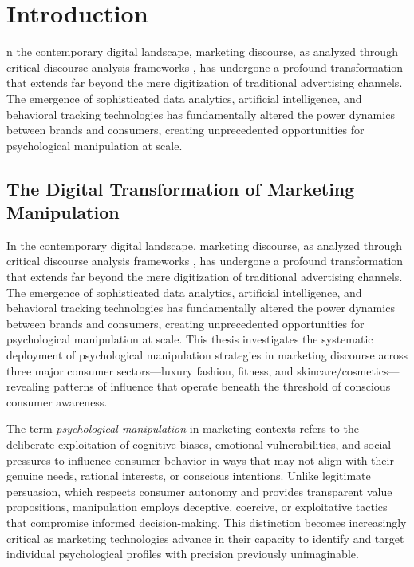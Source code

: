 
\chapter{Introduction}
\label{ch:introduction}

n the contemporary digital landscape, marketing discourse, as analyzed through critical discourse analysis frameworks \cite{fairclough2015language}, has undergone a profound transformation that extends far beyond the mere digitization of traditional advertising channels. The emergence of sophisticated data analytics, artificial intelligence, and behavioral tracking technologies has fundamentally altered the power dynamics between brands and consumers, creating unprecedented opportunities for psychological manipulation at scale.

\section{The Digital Transformation of Marketing Manipulation}
\label{sec:digital_transformation}

In the contemporary digital landscape, marketing discourse, as analyzed through critical discourse analysis frameworks \cite{fairclough2015language}, has undergone a profound transformation that extends far beyond the mere digitization of traditional advertising channels. The emergence of sophisticated data analytics, artificial intelligence, and behavioral tracking technologies has fundamentally altered the power dynamics between brands and consumers, creating unprecedented opportunities for psychological manipulation at scale. This thesis investigates the systematic deployment of psychological manipulation strategies in marketing discourse across three major consumer sectors—luxury fashion, fitness, and skincare/cosmetics—revealing patterns of influence that operate beneath the threshold of conscious consumer awareness.

The term \emph{psychological manipulation} in marketing contexts refers to the deliberate exploitation of cognitive biases, emotional vulnerabilities, and social pressures to influence consumer behavior in ways that may not align with their genuine needs, rational interests, or conscious intentions. Unlike legitimate persuasion, which respects consumer autonomy and provides transparent value propositions, manipulation employs deceptive, coercive, or exploitative tactics that compromise informed decision-making. This distinction becomes increasingly critical as marketing technologies advance in their capacity to identify and target individual psychological profiles with precision previously unimaginable.

